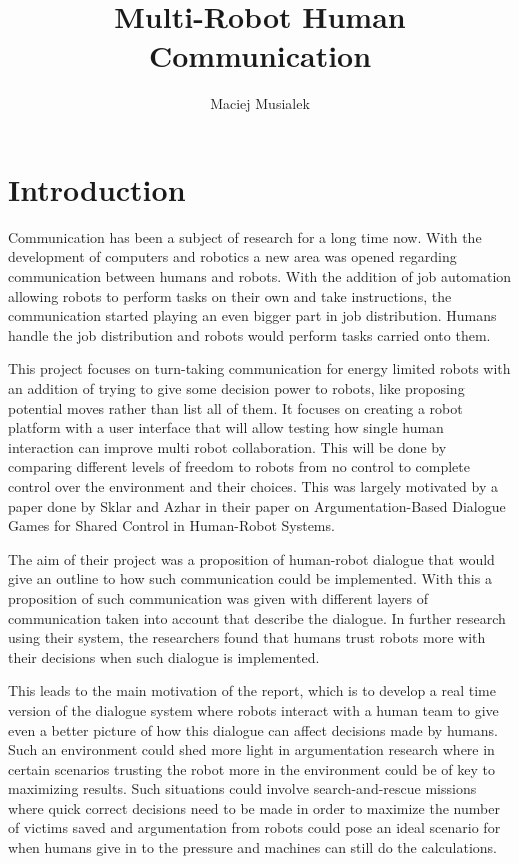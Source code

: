 \documentclass{report}
\begin{document}
  
  \title{Multi-Robot Human Communication}
  \author{Maciej Musialek}
  \maketitle

  \tableofcontents

  \chapter{Introduction}
    Communication has been a subject of research for a long time now. With the development of computers and robotics a new area was opened regarding communication between humans and robots. With the addition of job automation allowing robots to perform tasks on their own and take instructions, the communication started playing an even bigger part in job distribution. Humans handle the job distribution and robots would perform tasks carried onto them.

    This project focuses on turn-taking communication for energy limited robots with an addition of trying to give some decision power to robots, like proposing potential moves rather than list all of them. It focuses on creating a robot platform with a user interface that will allow testing how single human interaction can improve multi robot collaboration. This will be done by comparing different levels of freedom to robots from no control to complete control over the environment and their choices. This was largely motivated by a paper done by Sklar and Azhar\cite{Elizabeth} in their paper on Argumentation-Based Dialogue Games for Shared Control in Human-Robot Systems.

    The aim of their project was a proposition of human-robot dialogue that would give an outline to how such communication could be implemented. With this a proposition of such communication was given with different layers of communication taken into account that describe the dialogue. In further research using their system, the researchers found that humans trust robots more with their decisions when such dialogue is implemented.

    This leads to the main motivation of the report, which is to develop a real time version of the dialogue system where robots interact with a human team to give even a better picture of how this dialogue can affect decisions made by humans. Such an environment could shed more light in argumentation research where in certain scenarios trusting the robot more in the environment could be of key to maximizing results. Such situations could involve search-and-rescue missions where quick correct decisions need to be made in order to maximize the number of victims saved and argumentation from robots could pose an ideal scenario for when humans give in to the pressure and machines can still do the calculations.
\end{document}
